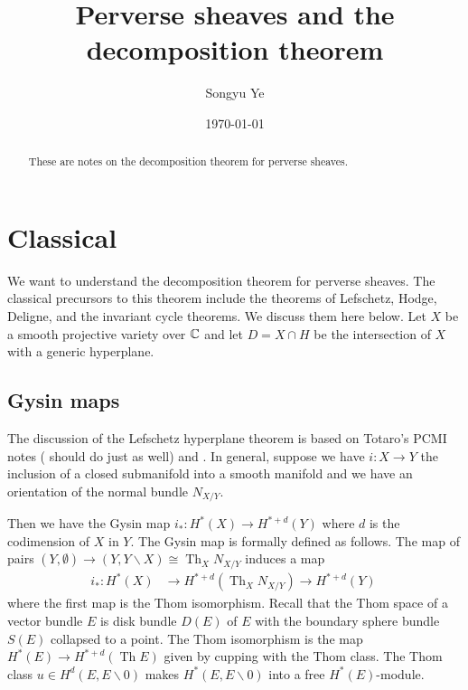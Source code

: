 \documentclass[12pt]{article}
\DeclareMathOperator{\Th}{Th}
\begin{document}
\rhead{\today}
\cfoot{\thepage}

\title{Perverse sheaves and the decomposition theorem}

\author{Songyu Ye}
\date{\today}
\maketitle


\begin{abstract}
    These are notes on the decomposition theorem for perverse sheaves. 
\end{abstract}

\tableofcontents

\section{Classical}
We want to understand the decomposition theorem for perverse sheaves. The classical
precursors to this theorem include the theorems of Lefschetz, Hodge, Deligne, and the invariant cycle theorems.
We discuss them here below. Let $X$ be a smooth projective variety over $\mathbb{C}$ and let $D = X \cap H$ be 
the intersection of $X$ with a generic hyperplane.

\subsection{Gysin maps}
The discussion of the Lefschetz hyperplane theorem is based on Totaro's PCMI notes (\cite{totaro} 
should do just as well) and \cite{griffiths-harris}. In general, suppose we have $i:X\to Y$ the inclusion of a
closed submanifold into a smooth manifold and we have an orientation of the normal 
bundle $N_{X/Y}$. 

\hfill

Then we have the Gysin map $i_*:H^*(X)\to H^{*+d}(Y)$ where $d$ is the codimension of $X$ in $Y$.
The Gysin map is formally defined as follows. The map of pairs $(Y,\emptyset)\to (Y,Y\backslash X) \cong
\Th_X N_{X/Y}$ induces a map \begin{align*}
    i_*:H^*(X) &\to H^{*+d}(\Th_X N_{X/Y}) \to H^{*+d}(Y)\
\end{align*} where the first map is the Thom isomorphism.
Recall that the Thom space of a vector bundle $E$ is disk bundle $D(E)$ of $E$ with the boundary
sphere bundle $S(E)$ collapsed to a point. The Thom isomorphism is the map $H^*(E)\to H^{*+d}(\Th E)$
given by cupping with the Thom class. The Thom class $u \in H^d(E,E\backslash 0)$ makes 
$H^*(E,E\backslash 0)$ into a free $H^*(E)$-module.
\end{document}
